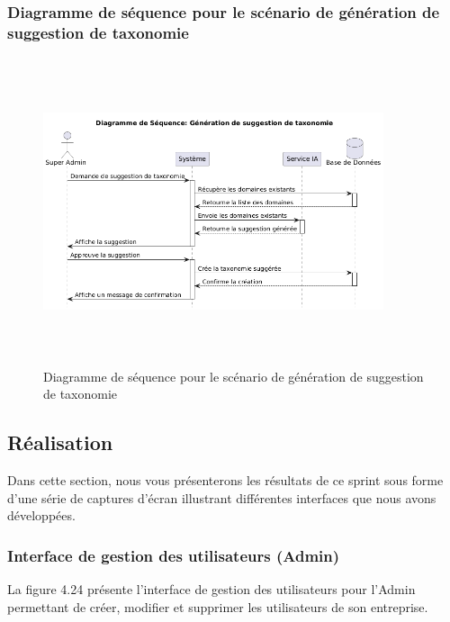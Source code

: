 \subsubsection{Diagramme de séquence pour le scénario de génération de suggestion de taxonomie}
\begin{figure}[H]
    \centering
    \includegraphics[width=10cm,height=9cm]{images/taxonomyaisq.png}
    \caption{Diagramme de séquence pour le scénario de génération de suggestion de taxonomie}
\end{figure}

\subsection{Réalisation}
\noindent Dans cette section, nous vous présenterons les résultats de ce sprint sous forme d'une série de captures d'écran illustrant différentes interfaces que nous avons développées.

\subsubsection{Interface de gestion des utilisateurs (Admin)}
\noindent La figure 4.24 présente l'interface de gestion des utilisateurs pour l'Admin permettant de créer, modifier et supprimer les utilisateurs de son entreprise.

